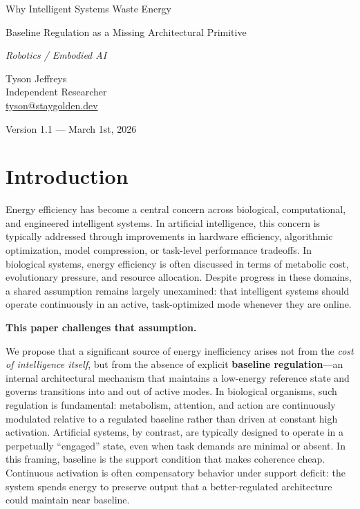 \documentclass[11pt]{article}
\begin{document}
\begin{titlepage}
\thispagestyle{empty}
\raggedright

\vspace*{0.62\textheight}

{\LARGE Why Intelligent Systems Waste Energy\par}
\vspace{0.2cm}
{\Large Baseline Regulation as a Missing Architectural Primitive\par}
\vspace{0.4em}
{\large\itshape Robotics / Embodied AI\par}

\vspace{1.6em}

Tyson Jeffreys\\
Independent Researcher\\
\href{mailto:tyson@staygolden.dev}{tyson@staygolden.dev}

\vspace{1.6em}

Version 1.1 --- March 1st, 2026

\end{titlepage}

\section{Introduction}
Energy efficiency has become a central concern across biological, computational, and engineered intelligent systems. In artificial intelligence, this concern is typically addressed through improvements in hardware efficiency, algorithmic optimization, model compression, or task-level performance tradeoffs. In biological systems, energy efficiency is often discussed in terms of metabolic cost, evolutionary pressure, and resource allocation. Despite progress in these domains, a shared assumption remains largely unexamined: that intelligent systems should operate continuously in an active, task-optimized mode whenever they are online.

\textbf{This paper challenges that assumption.}

We propose that a significant source of energy inefficiency arises not from the \emph{cost of intelligence itself}, but from the absence of explicit \textbf{baseline regulation}---an internal architectural mechanism that maintains a low-energy reference state and governs transitions into and out of active modes. In biological organisms, such regulation is fundamental: metabolism, attention, and action are continuously modulated relative to a regulated baseline rather than driven at constant high activation. Artificial systems, by contrast, are typically designed to operate in a perpetually “engaged” state, even when task demands are minimal or absent.
In this framing, baseline is the support condition that makes coherence cheap. Continuous activation is often compensatory behavior under support deficit: the system spends energy to preserve output that a better-regulated architecture could maintain near baseline.
\end{document}
